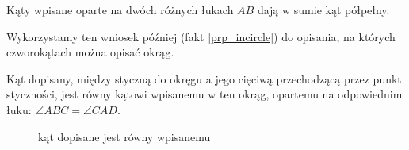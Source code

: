 \begin{corollary}
    \label{ab_twice_pi}
    Kąty wpisane oparte na dwóch różnych łukach $AB$ dają w sumie kąt półpełny.
\end{corollary}

Wykorzystamy ten wniosek później (fakt \ref{prp_incircle}) do opisania, na których czworokątach można opisać okrąg.

\begin{proposition}
    Kąt dopisany, między styczną do okręgu a jego cięciwą przechodzącą przez punkt styczności, jest równy kątowi wpisanemu w ten okrąg, opartemu na odpowiednim łuku: $\angle ABC = \angle CAD$.
\begin{figure}[H] \centering
\begin{comment}
\begin{tikzpicture}[scale=.4]
    \tkzDefPoint(0, 0){Zero}
    \tkzDefPoint(50:5){A}
    \tkzDefPoint(230:5){B}
    \tkzDefPoint(300:5){C}
    \tkzDefLine[tangent at=A](Zero) \tkzGetPoint{DD}
    \tkzDefPointsBy[projection=onto A--DD](C){D}
    \tkzDrawCircle[line width=0.5mm](Zero,A)
    \tkzDrawLines[add= 1 and 1, line width=0.3mm](A,D)
    \tkzDrawPolygons[line width=0.3mm](A,B,C)
    \tkzMarkAngle[arc=l,size=1.2,mark=||](C,B,A)
    \tkzMarkAngle[arc=l,size=1.2,mark=||](C,A,D)
    \tkzDrawPoints[size=3,color=black,fill=black!50](A,B,C,D)
    \tkzLabelPoint[above left](Zero){$O$}
    \tkzLabelPoint[above right](A){$A$}
    \tkzLabelPoint[below left](B){$B$}
    \tkzLabelPoint[below right](C){$C$}
    \tkzLabelPoint[above right](D){$D$}
\end{tikzpicture}
\end{comment}
    \caption{kąt dopisane jest równy wpisanemu}
\end{figure}
\end{proposition}
